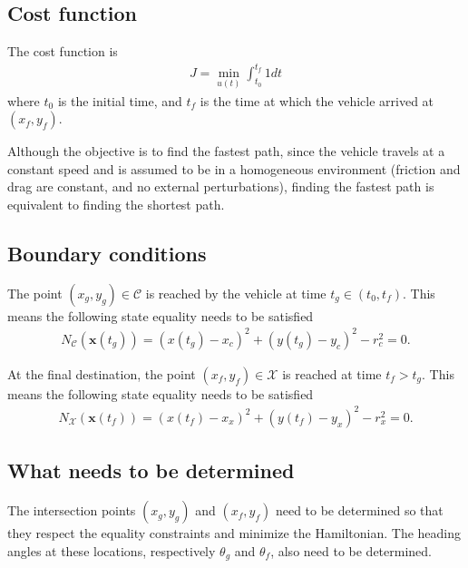 \documentclass[12pt]{article}
\begin{document}
\subsection{Cost function}

The cost function is
\begin{align}
    J = \underset{u(t)}{\min}\int_{t_0}^{t_f} 1dt
\end{align}
where $t_0$ is the initial time, and $t_f$ is the time at which the vehicle arrived at $(x_f,y_f)$.

Although the objective is to find the fastest path, since the vehicle travels at a constant speed and is assumed to be in a homogeneous environment (friction and drag are constant, and no external perturbations), finding the fastest path is equivalent to finding the shortest path.





\subsection{Boundary conditions}

The point $(x_g,y_g) \in \mathcal{C}$ is reached by the vehicle at time $t_g\in (t_0,t_f)$. This means the following state equality needs to be satisfied
\begin{align}
    N_\mathcal{C}(\mathbf{x}(t_g)) = (x(t_g)-x_c)^2 + (y(t_g)-y_c)^2 - r_c^2 = 0.
\end{align}

At the final destination, the point $(x_f,y_f)\in\mathcal{X}$ is reached at time $t_f >t_g$. This means the following state equality needs to be satisfied
\begin{align}
    N_\mathcal{X}(\mathbf{x}(t_f)) = (x(t_f)-x_x)^2 + (y(t_f)-y_x)^2 - r_x^2 = 0.
\end{align}

\subsection{What needs to be determined}

The intersection points $(x_g,y_g)$ and $(x_f,y_f)$ need to be determined so that they respect the equality constraints and minimize the Hamiltonian. The heading angles at these locations, respectively $\theta_g$ and $\theta_f$, also need to be determined.
\end{document}
